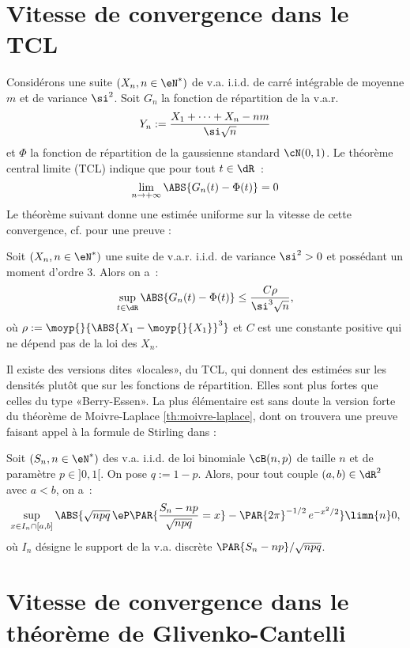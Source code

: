 %
\section{Vitesse de convergence dans le TCL}
%

Considérons une suite $(X_n,n\in\eN^*)$ de v.a. i.i.d. de carré intégrable de
moyenne $m$ et de variance $\si^2$. Soit $G_n$ la fonction de répartition de
la v.a.r.
$$
Y_n:=\frac{X_1+\cdots+X_n-nm}{\si\sqrt{n}}
$$
et $\Phi$ la fonction de répartition de la gaussienne standard $\cN(0,1)$. Le
théorème central limite (TCL) indique que pour tout $t\in\dR$~:
$$
\lim_{n\to+\infty}\ABS{G_n(t)-\Phi(t)}=0
$$
Le théorème suivant donne une estimée uniforme sur la vitesse de cette
convergence, cf. \cite{petrov} pour une preuve :

\begin{thm}
  Soit $(X_n,n\in\eN^*)$ une suite de v.a.r. i.i.d. de variance $\si^2>0$ et
  possédant un moment d'ordre $3$. Alors on a~:
  $$
  \sup_{t\in\dR}\ABS{G_n(t)-\Phi(t)} \leq \frac{C\rho}{\si^3\sqrt{n}},
  $$
  où $\rho:=\moyp{}{\ABS{X_1-\moyp{}{X_1}}^3}$ et $C$ est une constante positive qui ne
  dépend pas de la loi des $X_n$.
\end{thm}

Il existe des versions dites «locales», du TCL, qui donnent des estimées sur
les densités plutôt que sur les fonctions de répartition. Elles sont plus
fortes que celles du type «Berry-Essen».  La plus élémentaire est sans doute
la version forte du théorème de Moivre-Laplace \ref{th:moivre-laplace}, dont
on trouvera une preuve faisant appel à la formule de Stirling dans \cite[thm
2.2.4 page 35]{dacunha-castelle-duflo} :

\begin{thm}\label{th:moivre-laplace-fort}
  Soit $(S_n,n\in\eN^*)$ des v.a. i.i.d. de loi binomiale $\cB(n,p)$ de taille
  $n$ et de paramètre $p\in]0,1[$. On pose $q:=1-p$. Alors, pour tout couple
  $(a,b)\in\dR^2$ avec $a<b$, on a~:
  $$
  \sup_{x\in I_n\cap[a,b]}
  \ABS{\sqrt{npq}\,\eP\PAR{\frac{S_n-np}{\sqrt{npq}}=x}-\PAR{2\pi}^{-1/2}\,e^{-x^2/2}}
  \limn{n} 0,
  $$
  où $I_n$ désigne le support de la v.a. discrète $\PAR{S_n-np}/\sqrt{npq}$.
\end{thm}

%
\section{Vitesse de convergence dans le théorème de Glivenko-Cantelli}
\label{se:vitesse-tgc}
%

